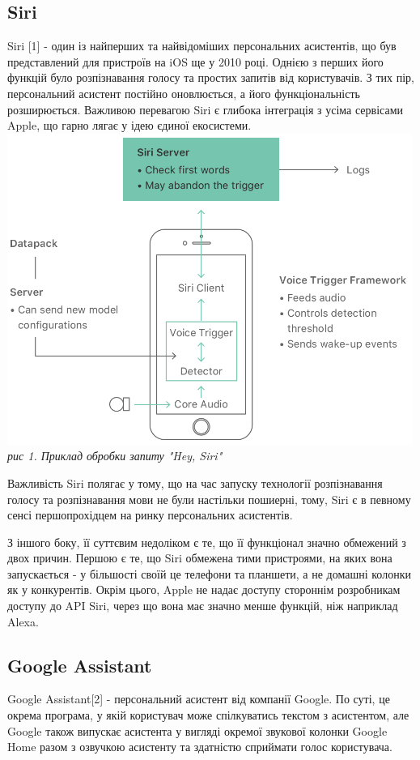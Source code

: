 \subsection{Siri}
Siri [1] - один із найперших та найвідоміших персональних асистентів, що був представлений для пристроїв на iOS ще у 2010 році. Однією з перших його функцій було розпізнавання голосу та простих запитів від користувачів. З тих пір, персональний асистент постійно оновлюється, а його функціональність розширюється. Важливою перевагою Siri є глибока інтеграція з усіма сервісами Apple, що  гарно лягає у ідею єдиної екосистеми.
\includegraphics[width = 500]{Dissertation/siri.png}\\
\textit{рис 1. Приклад обробки запиту "Hey, Siri"}


Важливість Siri полягає у тому, що на час запуску технології розпізнавання голосу та розпізнавання мови не були настільки пошиерні, тому, Siri є в певному сенсі першопрохідцем на ринку персональних асистентів.

З іншого боку, її суттєвим недоліком є те, що її функціонал значно обмежений з двох причин. Першою є те, що Siri обмежена тими пристроями, на яких вона запускається - у більшості своїй це телефони та планшети, а не домашні колонки як у конкурентів. Окрім цього, Apple не надає доступу стороннім розробникам доступу до API Siri, через що вона має значно менше функцій, ніж наприклад Alexa.



\subsection{Google Assistant}
Google Assistant[2] - персональний асистент від компанії Google. По суті, це окрема програма, у якій користувач може спілкуватись текстом з асистентом, але Google також випускає асистента у вигляді окремої звукової колонки Google Home разом з озвучкою асистенту та здатністю сприймати голос користувача. 

